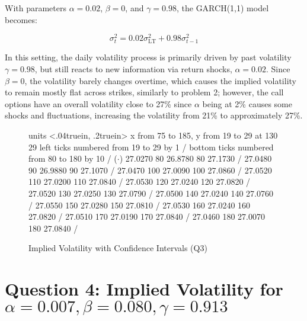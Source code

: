 \documentclass{report}
\begin{document}
With parameters $\alpha = 0.02$, $\beta = 0$, and $\gamma = 0.98$, the GARCH(1,1) model becomes:

\[ \sigma_t^2 = 0.02\sigma_{\text{LT}}^2 + 0.98\sigma_{t-1}^2 \]

In this setting, the daily volatility process is primarily driven by past volatility $\gamma = 0.98$, but still reacts to new information via return shocks, $\alpha = 0.02$. Since $\beta = 0$, the volatility barely changes overtime, which causes the implied volatility to remain mostly flat across strikes, similarly to problem 2; however, the call options have an overall volatility close to 27\% since $\alpha$ being at 2\% causes some shocks and fluctuations, increasing the volatility from 21\% to approximately 27\%. \\






\begin{figure}[h!]
\centering
\beginpicture
\setcoordinatesystem units <.04truein, .2truein> 
\setplotarea x from 75 to 185, y from  19 to 29
 at 130 29
\axis left ticks numbered from 19 to 29 by 1 /
\axis bottom ticks numbered from 80 to 180 by 10 /
\setplotsymbol ({$\cdot$})
 27.0270 80 26.8780 80 27.1730 /
 27.0480 90 26.9880 90 27.1070 /
 27.0470 100 27.0090 100 27.0860 /
 27.0520 110 27.0200 110 27.0840 /
 27.0530 120 27.0240 120 27.0820 /
 27.0520 130 27.0250 130 27.0790 /
 27.0500 140 27.0240 140 27.0760 /
 27.0550 150 27.0280 150 27.0810 /
 27.0530 160 27.0240 160 27.0820 /
 27.0510 170 27.0190 170 27.0840 /
 27.0460 180 27.0070 180 27.0840 /
\endpicture
\caption{Implied Volatility with Confidence Intervals (Q3)}
\end{figure}



\newpage









\section*{Question 4: Implied Volatility for \(\alpha = 0.007, \beta = 0.080, \gamma = 0.913\)}
\end{document}
